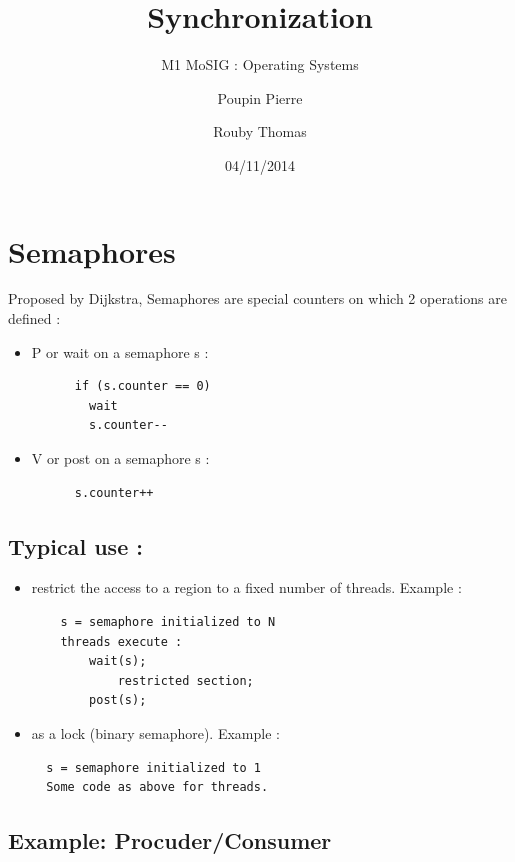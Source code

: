 \documentclass[a4paper,10pt]{article}
\title{\textbf{Synchronization}}
\subtitle{M1 MoSIG : Operating Systems}
\author{Poupin Pierre \and Rouby Thomas}
\date{04/11/2014}
\begin{document}
\maketitle



\section{Semaphores}

Proposed by Dijkstra, Semaphores are special counters on which 2 operations are defined :
\begin{itemize}
  \item P or wait on a semaphore s :
    \begin{verbatim}
      if (s.counter == 0)
        wait
        s.counter--
    \end{verbatim}
  \item V or post on a semaphore s :
  \begin{verbatim}
      s.counter++
  \end{verbatim}
\end{itemize}

\subsection{Typical use :} 

\begin{itemize}
  
\item restrict the access to a region to a fixed number of threads.
Example :

\begin{verbatim}
    s = semaphore initialized to N
    threads execute :
        wait(s);
            restricted section;
        post(s);
\end{verbatim}

\item as a lock (binary semaphore).
Example :
\begin{verbatim}
  s = semaphore initialized to 1
  Some code as above for threads.
\end{verbatim}
\end{itemize}

\subsection{Example: Procuder/Consumer}
\end{document}
